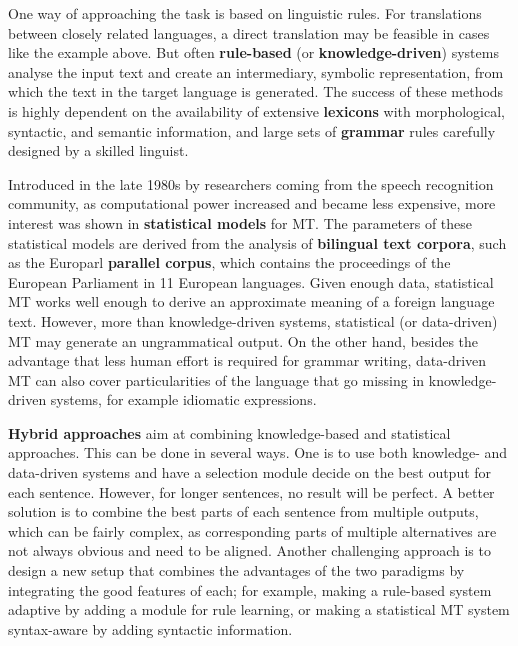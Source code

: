 \documentclass[]{../metanetpaper}
\begin{document}
\begin{multicols}{2}
One way of approaching the task is based on linguistic rules. For
translations between closely related languages, a direct translation
may be feasible in cases like the example above. But often {\bf rule-based}
(or {\bf knowledge-driven}) systems analyse the input text and create an
intermediary, symbolic representation, from which the text in the
target language is generated. The success of these methods is highly
dependent on the availability of extensive {\bf lexicons} with
morphological, syntactic, and semantic information, and large sets of
{\bf grammar} rules carefully designed by a skilled linguist.

Introduced in the late 1980s by researchers coming from the speech
recognition community, as computational power increased and became
less expensive, more interest was shown in {\bf statistical models} for
MT. The parameters of these statistical models are derived from the
analysis of {\bf bilingual text corpora}, such as the Europarl {\bf parallel
corpus}, which contains the proceedings of the European Parliament in
11 European languages. Given enough data, statistical MT works well
enough to derive an approximate meaning of a foreign language
text. However, more than knowledge-driven systems, statistical (or
data-driven) MT may generate an ungrammatical output. On the other
hand, besides the advantage that less human effort is required for
grammar writing, data-driven MT can also cover particularities of the
language that go missing in knowledge-driven systems, for example
idiomatic expressions.

{\bf Hybrid approaches} aim at combining knowledge-based and statistical
approaches. This can be done in several ways. One is to use both
knowledge- and data-driven systems and have a selection module decide
on the best output for each sentence. However, for longer sentences,
no result will be perfect. A better solution is to combine the best
parts of each sentence from multiple outputs, which can be fairly
complex, as corresponding parts of multiple alternatives are not
always obvious and need to be aligned. Another challenging approach is
to design a new setup that combines the advantages of the two
paradigms by integrating the good features of each; for example,
making a rule-based system adaptive by adding a module for rule
learning, or making a statistical MT system syntax-aware by adding
syntactic information.


\end{multicols}
\end{document}

